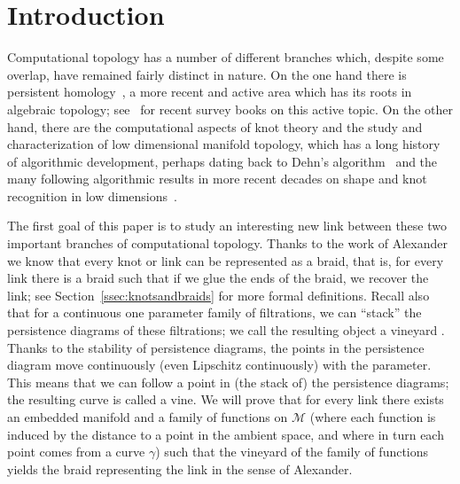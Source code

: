\documentclass[twoside,leqno]{article}
\newcommand{\M}{\mathcal{M}}
\begin{document}
\section{Introduction}

Computational topology has a number of different branches which, despite some overlap, have remained fairly distinct in nature. On the one hand there is persistent homology~\cite{Frosini1990,Robins1999,Edelsbrunner2002}, a more recent and active area which has its roots in algebraic topology; see~\cite{Oudot2015,Dey2022} for recent survey books on this active topic. On the other hand, there are the computational aspects of knot theory and the study and characterization of low dimensional manifold topology, which has a long history of algorithmic development, perhaps dating back to Dehn's algorithm~\cite{Dehn1911,Dehn1912} and the many following algorithmic results in more recent decades on shape and knot recognition in low dimensions~\cite{Rubinstein92, thompson1994thin, hass1997algorithms, birman1999new, Burton2020}.

The first goal of this paper is to study an interesting new link between these two important branches of computational topology.  Thanks to the work of Alexander~\cite{Alexander1923} we know that every knot or link can be represented as a braid, that is, for every link there is a braid such that if we glue the ends of the braid, we recover the link; see Section~\ref{ssec:knotsandbraids} for more formal definitions. Recall also that for a continuous one parameter family of filtrations, we can ``stack'' the persistence diagrams of these filtrations; we call the resulting object a vineyard \cite{CohenSteiner2006, turner2023representing,Hickok2022b}. Thanks to the stability of persistence diagrams, the points in the persistence diagram move continuously (even Lipschitz continuously) with the parameter. This means that we can follow a point in (the stack of)  the persistence diagrams; the resulting curve is called a vine.
We will prove that for every link there exists an embedded manifold and a family of functions on $\M$ (where each function is induced by the distance to a point in the ambient space, and where in turn each point comes from a curve $\gamma$) such that the vineyard of the family of functions yields the braid representing the link in the sense of Alexander. 
\end{document}
